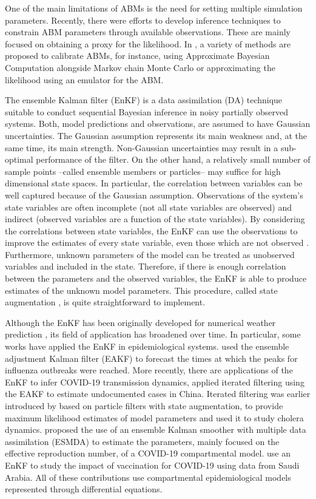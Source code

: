 \documentclass[11pt,a4paper]{article}
\begin{document}
One of the main limitations of ABMs is the need for setting  multiple simulation parameters. Recently, there were efforts to develop inference techniques to constrain ABM parameters through available observations. These are mainly focused on obtaining a proxy for the likelihood. In \cite{Hooten2020}, a variety of methods are proposed to calibrate ABMs, for instance, using Approximate Bayesian Computation alongside Markov chain Monte Carlo or approximating the likelihood using an emulator for the ABM.

The ensemble Kalman filter (EnKF) is a data assimilation (DA) technique suitable to conduct sequential Bayesian inference in noisy partially observed systems. Both, model predictions and observations, are assumed to have Gaussian uncertainties. The Gaussian assumption represents its main weakness and, at the same time, its main strength. Non-Gaussian uncertainties may result in a sub-optimal performance of the filter. On the other hand, a relatively small number of sample points --called ensemble members or particles-- may suffice for high dimensional state spaces. In particular, the correlation between variables can be well captured because of the Gaussian assumption. Observations of the system's state variables are often incomplete (not all state variables are observed) and indirect (observed variables are a function of the state variables). By considering the correlations between state variables, the EnKF can use the observations to improve the estimates of every state variable, even those which are not observed \citep{Carrassi2018}. Furthermore, unknown parameters of the model can be treated as unobserved variables and included in the state. Therefore, if there is enough correlation between the parameters and the observed variables, the EnKF is able to produce estimates of the unknown model parameters. This procedure, called state augmentation \citep{Annan2004, Ruiz2013}, is quite straightforward to implement.

Although the EnKF has  been originally developed for numerical weather prediction \citep{Evensen1994,Houtekamer1998}, its field of application has broadened over time. In particular, some works have applied the EnKF in epidemiological systems. \cite{Shaman2012, Shaman2013} used the ensemble adjustment Kalman filter (EAKF) to forecast the times at which the peaks for influenza outbreaks were reached. More recently, there are applications of the EnKF to infer COVID-19 transmission dynamics, \cite{Li2020} applied iterated filtering using the EAKF to estimate undocumented cases in China. Iterated filtering was earlier introduced by \cite{Ionides2006} based on particle filters with state augmentation, to provide maximum likelihood estimates of model parameters and used it to study cholera dynamics. \cite{Evensen2020} proposed the use of an ensemble Kalman smoother with multiple data assimilation (ESMDA) to estimate the parameters, mainly focused on the effective reproduction number, of a COVID-19 compartmental model. \cite{Ghostine2021} use an EnKF to study the impact of vaccination for COVID-19 using data from Saudi Arabia. All of these contributions use compartmental epidemiological models represented through differential equations. 
\end{document}

